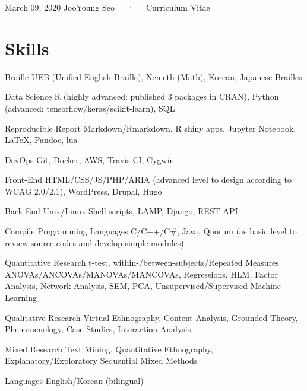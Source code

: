 \documentclass[11pt, a4paper]{awesome-cv}
\begin{document}
\makecvheader

\makecvfooter
  {March 09, 2020}
    {JooYoung Seo~~~·~~~Curriculum Vitae}
  {\thepage}





\hypertarget{skills}{%
\section{Skills}\label{skills}}

\begin{cvskills}
  \cvskill
    {Braille}
    {UEB (Unified English Braille), Nemeth (Math), Korean, Japanese Brailles}

  \cvskill
    {Data Science}
    {R (highly advanced: published 3 packages in CRAN), Python (advanced: tensorflow/keras/scikit-learn), SQL}

  \cvskill
    {Reproducible Report}
    {Markdown/Rmarkdown, R shiny apps, Jupyter Notebook, LaTeX, Pandoc, lua}

  \cvskill
    {DevOps}
    {Git, Docker, AWS, Travis CI, Cygwin}

  \cvskill
    {Front-End}
    {HTML/CSS/JS/PHP/ARIA (advanced level to design according to WCAG 2.0/2.1), WordPress, Drupal, Hugo}

  \cvskill
    {Back-End}
    {Unix/Linux Shell scripts, LAMP, Django, REST API}

  \cvskill
    {Compile Programming Languages}
    {C/C++/C\#, Java, Quorum (as basic level to review source codes and develop simple modules)}

  \cvskill
    {Quantitative Research}
    {t-test, within-/between-subjects/Repeated Measures ANOVAs/ANCOVAs/MANOVAs/MANCOVAs, Regressions, \newline HLM, Factor Analysis, Network Analysis, SEM, PCA, Unsupervised/Supervised Machine Learning}

  \cvskill
    {Qualitative Research}
    {Virtual Ethnography, Content Analysis, Grounded Theory, Phenomenology, Case Studies, Interaction Analysis}

  \cvskill
    {Mixed Research}
    {Text Mining, Quantitative Ethnography, Explanatory/Exploratory Sequential Mixed Methods}

  \cvskill
    {Languages}
    {English/Korean (bilingual)}
\end{cvskills}
\end{document}
